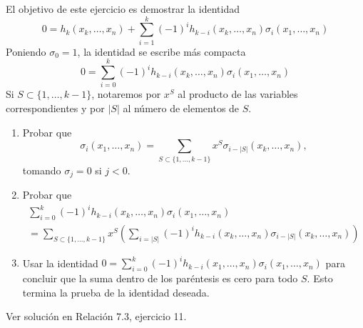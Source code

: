 \documentclass[twoside]{article}
\begin{document}
\begin{ejercicio}{2}
El objetivo de este ejercicio es demostrar la identidad
\[ 0 = h_k(x_k, \dots, x_n) + \sum_{i=1}^k (-1)^i h_{k-i}(x_k,\dots,x_n) σ_i(x_1,\dots,x_n) \]
Poniendo $σ_0 = 1$, la identidad se escribe más compacta
\[ 0 = \sum_{i=0}^k (-1)^i h_{k-i}(x_k,\dots,x_n) σ_i(x_1,\dots,x_n) \]
Si $S \subset \{1,\dots,k-1\}$, notaremos por $x^S$ al producto de las variables correspondientes y por $|S|$ al número de elementos de $S$.
\begin{enumerate}
\item Probar que
\[ σ_i(x_1,\dots,x_n) = \sum_{S \subset \{1,\dots,k-1\}} x^S σ_{i-|S|}(x_k,\dots,x_n), \]
tomando $σ_j = 0$ si $j < 0$.
\item Probar que
\begin{align*}
\sum_{i=0}^k (-1)^i h_{k-i}(x_k,\dots,x_n) σ_i(x_1,\dots,x_n)\\
= \sum_{S \subset \{1,\dots,k-1\}} x^S \left(\sum_{i=|S|} (-1)^i h_{k-i}(x_k,\dots,x_n) σ_{i-|S|}(x_k,\dots,x_n)\right)
\end{align*}
\item Usar la identidad $0 = \sum_{i=0}^k (-1)^i h_{k-i}(x_1,\dots,x_n) σ_i(x_1,\dots,x_n)$ para concluir que la suma dentro de los paréntesis es cero para todo $S$.
Esto termina la prueba de la identidad deseada.
\end{enumerate}
\end{ejercicio}
\begin{solucion}
Ver solución en Relación 7.3, ejercicio 11.
\end{solucion}
\end{document}
